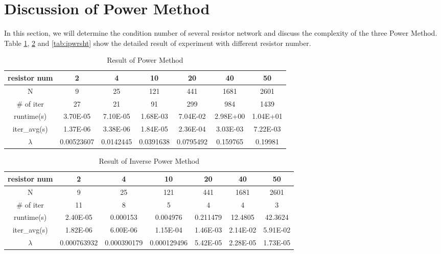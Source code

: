\documentclass{article}
\begin{document}
\section{Discussion of Power Method}
In this section, we will determine the condition number of several resistor network and discuss the complexity of the three Power Method. 
Table \ref{tab:pwr}, \ref{tab:ipwr} and \ref{tab:ipwrsht} show the detailed result of experiment with different resistor number.
\begin{table}[H]
    \begin{center}
        \begin{tabular}{|c|c|c|c|c|c|c|}
            \hline
            resistor num & 2 & 4 & 10 & 20 & 40 & 50 \\ \hline
            N & 9 & 25 & 121 & 441 & 1681 & 2601 \\ \hline
            \# of iter & 27 & 21 & 91 & 299 & 984 & 1439 \\ \hline
            runtime(s) & 3.70E-05 & 7.10E-05 & 1.68E-03 & 7.04E-02 & 2.98E+00 & 1.04E+01 \\ \hline
            iter\_avg(s) & 1.37E-06 & 3.38E-06 & 1.84E-05 & 2.36E-04 & 3.03E-03 & 7.22E-03 \\ \hline
            $\lambda$ & 0.00523607 & 0.0142445 & 0.0391638 & 0.0795492 & 0.159765 & 0.19981 \\ \hline
        \end{tabular}
    \end{center}
    \caption{Result of Power Method}
    \label{tab:pwr}
\end{table}
\begin{table}[H]
    \begin{center}
        \begin{tabular}{|c|c|c|c|c|c|c|}
            \hline
            resistor num & 2 & 4 & 10 & 20 & 40 & 50 \\ \hline
            N & 9 & 25 & 121 & 441 & 1681 & 2601 \\ \hline
            \# of iter & 11 & 8 & 5 & 4 & 4 & 3 \\ \hline
            runtime(s) & 2.40E-05 & 0.000153 & 0.004976 & 0.211479 & 12.4805 & 42.3624 \\ \hline
            iter\_avg(s) & 1.82E-06 & 6.00E-06 & 1.15E-04 & 1.46E-03 & 2.14E-02 & 5.91E-02 \\ \hline
            $\lambda$ & 0.000763932 & 0.000390179 & 0.000129496 & 5.42E-05 & 2.28E-05 & 1.73E-05 \\ \hline
        \end{tabular}
    \end{center}
    \caption{Result of Inverse Power Method}
    \label{tab:ipwr}
\end{table}
\end{document}

